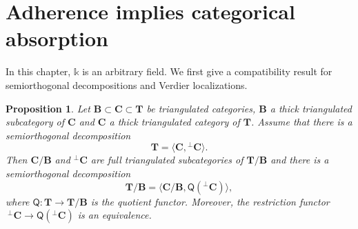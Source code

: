 \documentclass[a4paper,11pt, reqno]{amsart}
\def\BB{\mathbf B}
\def\CC{\mathbf C}
\def\TT{\mathbf T}
\newcommand{\bQ}{\mathsf{Q}}
\theoremstyle{plain}
\newtheorem{proposition}[dummy]{Proposition}
\theoremstyle{definition}
\numberwithin{equation}{section}
\begin{document}
\section{Adherence implies categorical absorption}

\noindent
In this chapter, $\mathbb{k}$ is an arbitrary field.
We first give a compatibility result for
semiorthogonal decompositions and Verdier localizations.

\begin{proposition}\label{lem:sod-and-quotient}
Let $\BB \subset \CC \subset \TT$ be triangulated categories, $\BB$ a thick triangulated subcategory of $\CC$ and $\CC$ a thick triangulated category of $\TT$. Assume that there is a semiorthogonal decomposition
\[
\TT = \langle \CC ,  {^{\perp}\CC} \rangle .
\]
Then $\CC / \BB$ and $^{\perp}\CC$ are full triangulated subcategories of $\TT / \BB$ and there is a semiorthogonal decomposition
\[
\TT / \BB = \langle \CC / \BB ,  \bQ ( {^{\perp}\CC} ) \rangle , 
\]
where $\bQ \colon \TT \to \TT / \BB$ is the quotient functor.
Moreover, the restriction functor $\ {^{\perp}\CC} \to \bQ ( {^{\perp}\CC} )$ is an equivalence.
\end{proposition}
\end{document}
